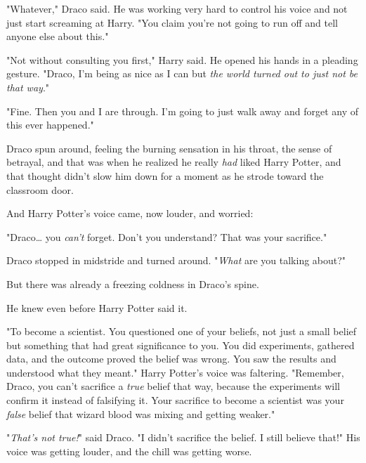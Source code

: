"Whatever," Draco said. He was working very hard to control his voice and not 
just start screaming at Harry. "You claim you're not going to run off and tell 
anyone else about this."

"Not without consulting you first," Harry said. He opened his hands in a 
pleading gesture. "Draco, I'm being as nice as I can but \emph{the world turned 
out to just not be that way}."

"Fine. Then you and I are through. I'm going to just walk away and forget any 
of this ever happened."

Draco spun around, feeling the burning sensation in his throat, the sense of 
betrayal, and that was when he realized he really \emph{had} liked Harry 
Potter, and that thought didn't slow him down for a moment as he strode toward 
the classroom door.

And Harry Potter's voice came, now louder, and worried:

"Draco{\ldots} you \emph{can't} forget. Don't you understand? That was your 
sacrifice."

Draco stopped in midstride and turned around. "\emph{What} are you talking 
about?"

But there was already a freezing coldness in Draco's spine.

He knew even before Harry Potter said it.

"To become a scientist. You questioned one of your beliefs, not just a small 
belief but something that had great significance to you. You did experiments, 
gathered data, and the outcome proved the belief was wrong. You saw the results 
and understood what they meant." Harry Potter's voice was faltering. "Remember, 
Draco, you can't sacrifice a \emph{true} belief that way, because the 
experiments will confirm it instead of falsifying it. Your sacrifice to become 
a scientist was your \emph{false} belief that wizard blood was mixing and 
getting weaker."

"\emph{That's not true!}" said Draco. "I didn't sacrifice the belief. I still 
believe that!" His voice was getting louder, and the chill was getting worse.

